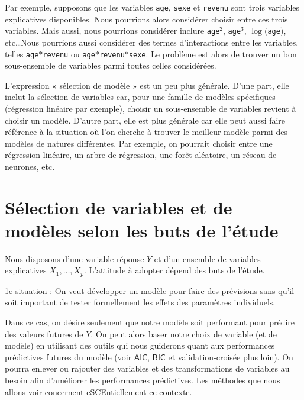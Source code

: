 \documentclass[
]{book}
\theoremstyle{definition}
\theoremstyle{definition}
\theoremstyle{definition}
\theoremstyle{remark}
\begin{document}
Par exemple, supposons que les variables \texttt{age}, \texttt{sexe} et \texttt{revenu} sont trois variables explicatives disponibles. Nous pourrions alors considérer choisir entre ces trois variables. Mais aussi, nous pourrions considérer inclure \texttt{age}\({}^2\), \texttt{age}\({}^3\), \(\log(\)\texttt{age}\()\), etc\ldots Nous pourrions aussi considérer des termes d'interactions entre les variables, telles \texttt{age}\(*\)\texttt{revenu} ou \texttt{age}\(*\)\texttt{revenu}\(*\)\texttt{sexe}. Le problème est alors de trouver un bon sous-ensemble de variables parmi toutes celles considérées.

L'expression « sélection de modèle » est un peu plus générale. D'une part, elle inclut la sélection de variables car, pour une famille de modèles spécifiques (régression linéaire par exemple), choisir un sous-ensemble de variables revient à choisir un modèle. D'autre part, elle est plus générale car elle peut aussi faire référence à la situation où l'on cherche à trouver le meilleur modèle parmi des modèles de natures différentes. Par exemple, on pourrait choisir entre une régression linéaire, un arbre de régression, une forêt aléatoire, un réseau de neurones, etc.

\hypertarget{suxe9lection-de-variables-et-de-moduxe8les-selon-les-buts-de-luxe9tude}{%
\section{Sélection de variables et de modèles selon les buts de l'étude}\label{suxe9lection-de-variables-et-de-moduxe8les-selon-les-buts-de-luxe9tude}}

Nous disposons d'une variable réponse \(Y\) et d'un ensemble de variables explicatives \(X_1, \ldots, X_p\). L'attitude à adopter dépend des buts de l'étude.

1e situation : On veut développer un modèle pour faire des prévisions sans qu'il soit important de tester formellement les effets des paramètres individuels.

Dans ce cas, on désire seulement que notre modèle soit performant pour prédire des valeurs futures de \(Y\). On peut alors baser notre choix de variable (et de modèle) en utilisant des outils qui nous guiderons quant aux performances prédictives futures du modèle (voir \(\mathsf{AIC}\), \(\mathsf{BIC}\) et validation-croisée plus loin). On pourra enlever ou rajouter des variables et des transformations de variables au besoin afin d'améliorer les performances prédictives. Les méthodes que nous allons voir concernent eSCEntiellement ce contexte.
\end{document}

